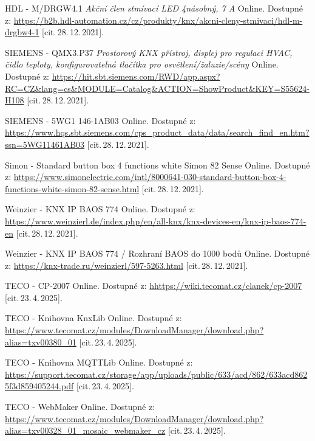\begin{thebibliography}{99}
        HDL - M/DRGW4.1 \textit{Akční člen stmívací LED 4násobný, 7 A}\/ Online. 
		Dostupné z:
    \url{https://b2b.hdl-automation.cz/cz/produkty/knx/akcni-cleny-stmivaci/hdl-m-drgbw4-1}
		[cit.\,28.\,12.\,2021].
    
		SIEMENS - QMX3.P37 \textit{Prostorový KNX přístroj, displej pro regulaci HVAC, čidlo teploty, konfigurovatelná tlačítka pro osvětlení/žaluzie/scény}\/ Online. 
		Dostupné z:
    \url{https://hit.sbt.siemens.com/RWD/app.aspx?RC=CZ&lang=cs&MODULE=Catalog&ACTION=ShowProduct&KEY=S55624-H108}
		[cit.\,28.\,12.\,2021].
    
		SIEMENS - 5WG1 146-1AB03 \/ Online. 
		Dostupné z:
    \url{https://www.hqs.sbt.siemens.com/cps_product_data/data/search_find_en.htm?ssn=5WG11461AB03}
		[cit.\,28.\,12.\,2021].  
    
		Simon - Standard button box 4 functions white Simon 82 Sense\/ Online. 
		Dostupné z:
    \url{https://www.simonelectric.com/intl/8000641-030-standard-button-box-4-functions-white-simon-82-sense.html}
		[cit.\,28.\,12.\,2021].

		Weinzier - KNX IP BAOS 774\/ Online. 
		Dostupné z:
    \url{https://www.weinzierl.de/index.php/en/all-knx/knx-devices-en/knx-ip-baos-774-en}
		[cit.\,28.\,12.\,2021].
    
		Weinzier - KNX IP BAOS 774 / Rozhraní BAOS do 1000 bodů\/ Online. 
		Dostupné z:
    \url{https://knx-trade.ru/weinzierl/597-5263.html}
		[cit.\,28.\,12.\,2021].

		TECO - CP-2007\/ Online. 
		Dostupné z:
	\url{hhttps://wiki.tecomat.cz/clanek/cp-2007}
		[cit.\,23.\,4.\,2025].

		TECO - Knihovna KnxLib\/ Online. 
		Dostupné z:
	\url{https://www.tecomat.cz/modules/DownloadManager/download.php?alias=txv00380_01}
		[cit.\,23.\,4.\,2025].

		TECO - Knihovna MQTTLib\/ Online. 
		Dostupné z:
	\url{https://support.tecomat.cz/storage/app/uploads/public/633/acd/862/633acd8625f3d859405244.pdf}
		[cit.\,23.\,4.\,2025].

		TECO - WebMaker\/ Online. 
		Dostupné z:
	\url{https://www.tecomat.cz/modules/DownloadManager/download.php?alias=txv00328_01_mosaic_webmaker_cz}
		[cit.\,23.\,4.\,2025].
\end{thebibliography} 
%
%
%
